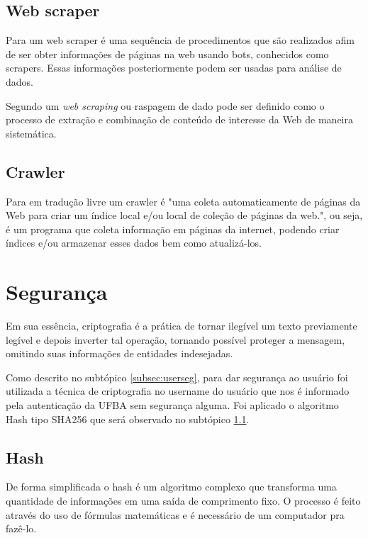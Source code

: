 \documentclass[12pt, a4paper]{report}
\begin{document}
\subsection{Web scraper}
Para \cite{laender2002} um web scraper é uma sequência de procedimentos que são realizados afim de ser obter informações de páginas na web usando bots, conhecidos como scrapers. Essas informações posteriormente podem ser usadas para análise de dados.

Segundo \cite{Glezscraping2013} um \textit{web scraping} ou raspagem de dado pode ser definido como o processo de extração e combinação de conteúdo de interesse da Web de maneira sistemática.

\subsection{Crawler}
Para \cite[p. 1]{ilprints376} em tradução livre um crawler é "uma coleta automaticamente de páginas da Web para criar um índice local e/ou local de coleção de páginas da web.", ou seja, é um programa que coleta informação em páginas da internet, podendo criar índices e/ou armazenar esses dados bem como atualizá-los. 


\section{ Segurança}
\label{sec:seguranca}
Em sua essência, criptografia é a prática de tornar ilegível um texto previamente legível e depois inverter tal operação, tornando possível proteger a mensagem, omitindo suas informações de entidades indesejadas. 

Como descrito no subtópico \ref{subsec:userseg}, para dar segurança ao usuário foi utilizada a técnica de criptografia no username do usuário que nos é informado pela autenticação da UFBA sem segurança alguma. Foi aplicado o algoritmo Hash tipo SHA256 que será observado no subtópico \ref{subsec:hash}.


\subsection{Hash}
\label{subsec:hash}
De forma simplificada o hash é um algoritmo complexo que  transforma uma quantidade de informações em uma saída de comprimento fixo. O processo é feito através do uso de fórmulas matemáticas e é necessário de um computador pra fazê-lo.
\end{document}
